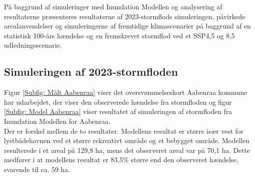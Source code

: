 
På baggrund af simuleringer med Inundation Modellen og analysering af resultaterne præsenteres resultaterne af 2023-stormflods simuleringen, påvirkede arealanvendelser og simuleringerne af fremtidige klimascenarier på baggrund af en statistisk 100-års hændelse og en fremskrevet stormflod ved et SSP4,5 og 8,5 udledningsscenarie. 

\subsection{Simuleringen af 2023-stormfloden}
Figur \ref{Subfig: Målt Aabenraa} viser det oversvømmelseskort Aabenraa kommune har udarbejdet, der viser den observerede hændelse fra stormfloden og figur \ref{Subfig: Model Aabenraa} viser resultatet af simuleringen af stormfloden fra Inundation Modellen for Aabenraa. \\
Der er forskel mellem de to resultater. Modellens resultat er større især vest for lystbådehavnen ved et større rekreativt område og et bebygget område. Modellen resulterede i et areal på 129,8 ha, mens det observeret areal var på 70,1 ha. Dette medfører i at modellens resultat er 83,5\% større end den observeret hændelse, svarende til ca. 59 ha.
